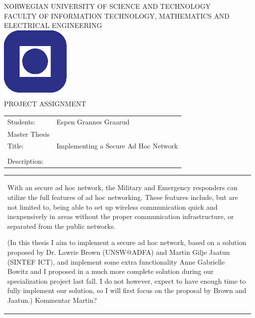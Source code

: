 
%
\setlength{\parindent}{0pt} 
\setlength{\parskip}{2ex}
\begin{titlepage}
\begin{center}
\textsc{NORWEGIAN UNIVERSITY OF SCIENCE AND TECHNOLOGY\\
FACULTY OF  INFORMATION TECHNOLOGY, MATHEMATICS AND ELECTRICAL ENGINEERING} \\
\vspace{0.5cm} 
\includegraphics[scale=0.5]{images/NTNU_logo.png} \\

\vspace{1.0cm}
{\Huge{PROJECT ASSIGNMENT}}
\vspace{1.0cm}

\begin{tabular}{ p{4cm} p{11cm}}

Students:	& Espen Grannes Graarud \\
Master Thesis \\
Title: & Implementing a Secure Ad Hoc Network \\\\
Description: & \\
\end{tabular}
{\small{\begin{tabular}{p{15cm}}
\vspace{0.2cm}
 
With an secure ad hoc network, the Military and Emergency responders can utilize the full features of ad hoc
networking. These features include, but are not limited to, being able to set up wireless communication quick and
inexpensively in areas without the proper communication infrastructure, or separated from the public networks.

(In this thesis I aim to implement a secure ad hoc network, based on a solution proposed by Dr. Lawrie Brown
(UNSW@ADFA) and Martin Gilje Jaatun (SINTEF ICT), and implement some extra functionality Anne Gabrielle Bowitz
and I proposed in a much more complete solution during our specialization project last fall. I do not however,
expect to have enough time to fully implement our solution, so I will first focus on the proposal by Brown and
Jaatun.) Kommentar Martin?



\end{tabular}}}
\end{center}
\end{titlepage}
